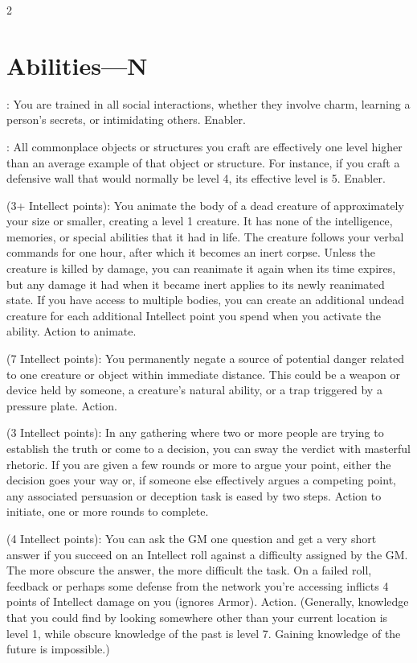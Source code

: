 \begin{multicols}{2}

\section{Abilities—N}

: You are trained in all social interactions, whether they involve charm, learning a person’s secrets, or intimidating others. Enabler. 
 
: All commonplace objects or structures you craft are effectively one level higher than an average example of that object or structure. For instance, if you craft a defensive wall that would normally be level 4, its effective level is 5. Enabler. 
 
 (3+ Intellect points): You animate the body of a dead creature of approximately your size or smaller, creating a level 1 creature. It has none of the intelligence, memories, or special abilities that it had in life. The creature follows your verbal commands for one hour, after which it becomes an inert corpse. Unless the creature is killed by damage, you can reanimate it again when its time expires, but any damage it had when it became inert applies to its newly reanimated state. If you have access to multiple bodies, you can create an additional undead creature for each additional Intellect point you spend when you activate the ability. Action to animate. 
 
 (7 Intellect points): You permanently negate a source of potential danger related to one creature or object within immediate distance. This could be a weapon or device held by someone, a creature’s natural ability, or a trap triggered by a pressure plate. Action. 
 
 (3 Intellect points): In any gathering where two or more people are trying to establish the truth or come to a decision, you can sway the verdict with masterful rhetoric. If you are given a few rounds or more to argue your point, either the decision goes your way or, if someone else effectively argues a competing point, any associated persuasion or deception task is eased by two steps. Action to initiate, one or more rounds to complete. 
 
 (4 Intellect points): You can ask the GM one question and get a very short answer if you succeed on an Intellect roll against a difficulty assigned by the GM. The more obscure the answer, the more difficult the task. On a failed roll, feedback or perhaps some defense from the network you’re accessing inflicts 4 points of Intellect damage on you (ignores Armor). Action. (Generally, knowledge that you could find by looking somewhere other than your current location is level 1, while obscure knowledge of the past is level 7. Gaining knowledge of the future is impossible.)
 

\end{multicols}
